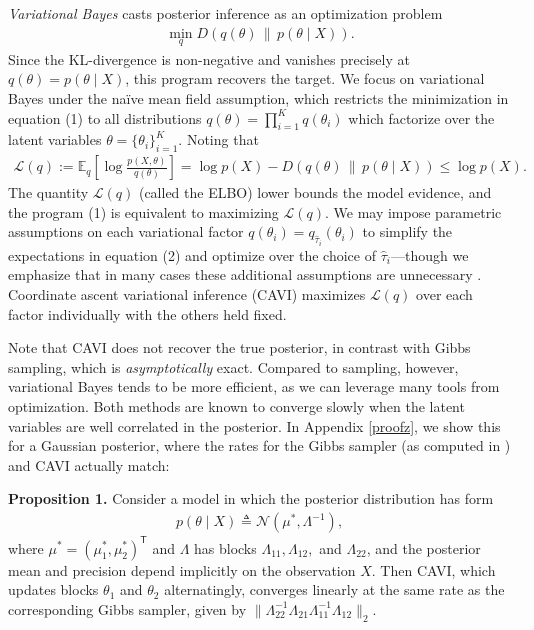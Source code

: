 \documentclass{article}
\begin{document}
{\sl Variational Bayes} casts posterior inference as an optimization problem
\begin{align}
\min_{q}D(q(\theta)\,\|\, p(\theta\mid X)).
\end{align}
Since the KL-divergence is non-negative and vanishes precisely at $q(\theta) = p(\theta\mid X)$, this program recovers the target. We focus on variational Bayes under the na\"ive mean field assumption, which restricts the minimization in equation (1) to all distributions $q(\theta) = \prod_{i=1}^Kq(\theta_i)$ which factorize over the latent variables $\theta = \{\theta_i\}_{i=1}^K$. Noting that
\begin{align}
\mathcal L(q) :=  \mathbb E_q\left[\log\frac{p(X,\theta)}{q(\theta)}\right] =\log p(X) -  D(q(\theta)\,\|\, p(\theta\mid X)) \le \log p(X).
\end{align}
The quantity $\mathcal L(q)$ (called the ELBO) lower bounds the model evidence, and the program (1) is equivalent to maximizing $\mathcal L(q)$. We may impose parametric assumptions on each variational factor $q(\theta_i) = q_{\widehat\tau_i}(\theta_i)$ to simplify the expectations in equation (2) and optimize over the choice of $\widehat\tau_i$---though we emphasize that in many cases these additional assumptions are unnecessary \cite{Beal,Blei}. Coordinate ascent variational inference (CAVI) maximizes $\mathcal L(q)$ over each factor individually with the others held fixed. 

Note that CAVI does not recover the true posterior, in contrast with Gibbs sampling, which is {\sl asymptotically} exact. Compared to sampling, however, variational Bayes tends to be more efficient, as we can leverage many tools from optimization. Both methods are known to converge slowly when the latent variables are well correlated in the posterior. In Appendix \ref{proofz}, we show this for a Gaussian posterior, where the rates for the Gibbs sampler (as computed in \cite{Sahu}) and CAVI actually match:

{\bf Proposition 1.} Consider a model in which the posterior distribution has form
\begin{align}
p(\theta\mid X) \triangleq \mathcal N(\mu^*,\Lambda^{-1}),
\end{align}
where $\mu^* = (\mu_1^*,\mu_2^*)^{\mathsf T}$ and $\Lambda$ has blocks $\Lambda_{11}, \Lambda_{12},$ and $\Lambda_{22}$, and the posterior mean and precision depend implicitly on the observation $X$. Then CAVI, which updates blocks $\theta_1$ and $\theta_2$ alternatingly, converges linearly at the same rate as the corresponding Gibbs sampler, given by $\|\Lambda_{22}^{-1}\Lambda_{21}\Lambda_{11}^{-1}\Lambda_{12}\|_2$.
\end{document}

